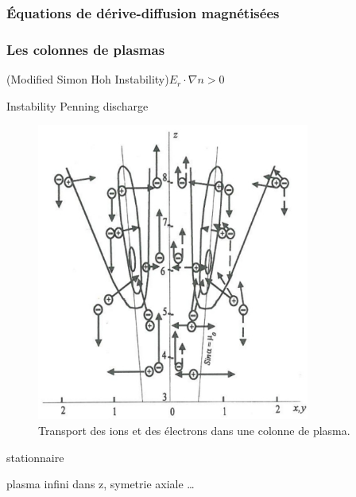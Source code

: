 \begin{refsection}
\subsubsection{Équations de dérive-diffusion magnétisées}

\subsubsection{Les colonnes de plasmas}
\parencite{RosenbluthSimon}

\parencite{Sakawa} (Modified Simon Hoh Instability)$E_r\cdot\nabla n > 0$

\parencite{Hoh} Instability Penning discharge

\begin{figure}[htbp]
\centering
\includegraphics[width=0.8\textwidth]{figures/4-magnetizedColumn.jpg}
{\caption{Transport des ions et des électrons dans une colonne de
plasma\parencite{Rozhansky}.}
\label{1-magnetizedColumn}}
\end{figure}


\parencite{Fruchtman} stationnaire

\parencite{Sternberg} plasma infini dans z, symetrie axiale \ldots 
%
%
\end{refsection}

